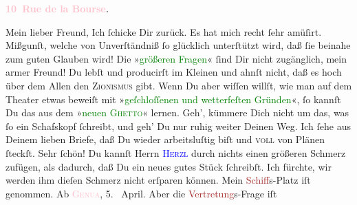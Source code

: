            \pstart
           \begin{otherlanguage}{french}\textcolor{gray}{\textbf{\textbf{\textcolor{pink}{10 Rue de la Bourse}{}\ledrightnote{\textcolor{pink}{rue de la Bourse}}.}}}\end{otherlanguage}\pend
           \pstart\center{}Mein lieber Freund,\pend\pstart
           Ich ſchicke Dir \label{K_L02841-1v}\label{K_L02841-1h} zurück. Es hat mich  recht ſehr amüſirt.
               Mißgunſt, welche von Unverſtändniß ſo glücklich unterſtützt wird, daß ſie beinahe zum
               guten Glauben wird! Die »\textcolor{green}{größeren
                  Fragen}{}« ſind Dir nicht zugänglich, mein armer Freund! Du lebſt und producirſt
               im Kleinen und ahnſt nicht, daß es hoch über dem Allen den \textsc{Zionismus} gibt. Wenn Du aber wiſſen willſt, wie man auf dem Theater etwas
               beweiſt mit »\textcolor{green}{geſchloſſenen und
                  wetterfeſten Gründen}{}«, ſo kannſt Du {\pb}das aus
               dem »\textcolor{green}{neuen \textsc{Ghetto}}{}\ledrightnote{\textcolor{green}{Das neue Ghetto}}« lernen.\pend
           \pstart
           Geh’, kümmere Dich nicht um das, was ſo ein Schafskopf ſchreibt, und geh’ Du nur ruhig weiter Deinen Weg.
               Ich ſehe aus Deinem lieben Briefe, daß Du wieder arbeitsluſtig
               biſt und \textsc{voll} von Plänen ſteckſt. Sehr ſchön! Du kannſt
               Herrn \textsc{\textcolor{blue}{Herzl}{}\ledrightnote{\textcolor{blue}{Theodor Herzl}}} durch nichts einen größeren Schmerz zufügen, als dadurch, daß Du ein neues
               gutes Stück ſchreibſt. Ich fürchte, wir werden ihm dieſen Schmerz nicht erſparen
               können.\pend
           \pstart
           Mein \textcolor{brown}{Schiff}{}s-Platz iſt
               genommen. Ab \textsc{\textcolor{pink}{Genua}{}\ledrightnote{\textcolor{pink}{Genua}}}, 5.  April.
               Aber die \textcolor{brown}{Vertretung}{}s-Frage iſt

